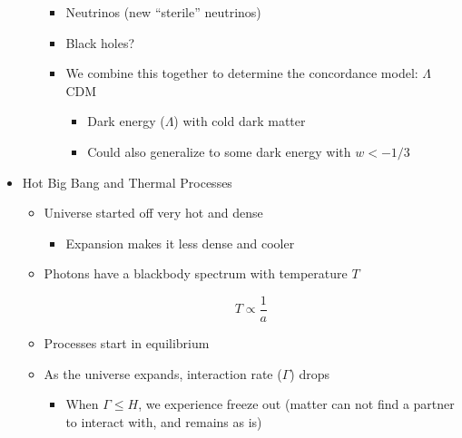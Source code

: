 \begin{itemize}
\begin{itemize}
\begin{itemize}
          \item Neutrinos (new ``sterile'' neutrinos)

          \item Black holes?

          \item We combine this together to determine the concordance model: $\Lambda$CDM

            \begin{itemize}

              \item Dark energy ($\Lambda$) with cold dark matter

              \item Could also generalize to some dark energy with $w<-1/3$

            \end{itemize}

        \end{itemize}

    \end{itemize}

  \item Hot Big Bang and Thermal Processes

    \begin{itemize}

      \item Universe started off very hot and dense

        \begin{itemize}

          \item Expansion makes it less dense and cooler

        \end{itemize}

      \item Photons have a blackbody spectrum with temperature $T$

        $$T\propto \frac{1}{a}$$

      \item Processes start in equilibrium

      \item As the universe expands, interaction rate ($\Gamma$) drops

        \begin{itemize}

          \item When $\Gamma\leq H$, we experience freeze out (matter can not find a partner to interact with, and remains as is)


\end{itemize}
\end{itemize}
\end{itemize}
